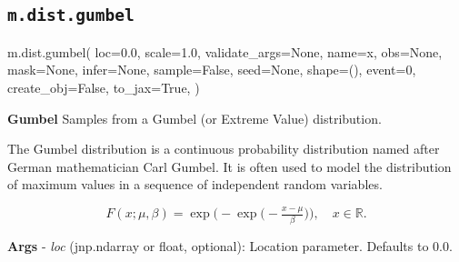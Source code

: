 \documentclass[
  letterpaper,
  DIV=11,
  numbers=noendperiod]{scrartcl}
\newenvironment{Shaded}{\begin{snugshade}}{\end{snugshade}}
\newcommand{\DecValTok}[1]{\textcolor[rgb]{0.68,0.00,0.00}{#1}}
\newcommand{\FloatTok}[1]{\textcolor[rgb]{0.68,0.00,0.00}{#1}}
\newcommand{\NormalTok}[1]{\textcolor[rgb]{0.00,0.23,0.31}{#1}}
\newcommand{\OperatorTok}[1]{\textcolor[rgb]{0.37,0.37,0.37}{#1}}
\newcommand{\StringTok}[1]{\textcolor[rgb]{0.13,0.47,0.30}{#1}}
\newcommand{\VariableTok}[1]{\textcolor[rgb]{0.07,0.07,0.07}{#1}}
\begin{document}
\subsection{\texorpdfstring{\texttt{m.dist.gumbel}}{m.dist.gumbel}}\label{gumbel}

\begin{Shaded}
\begin{Highlighting}[]
\NormalTok{m.dist.gumbel(}
\NormalTok{    loc}\OperatorTok{=}\FloatTok{0.0}\NormalTok{,}
\NormalTok{    scale}\OperatorTok{=}\FloatTok{1.0}\NormalTok{,}
\NormalTok{    validate\_args}\OperatorTok{=}\VariableTok{None}\NormalTok{,}
\NormalTok{    name}\OperatorTok{=}\StringTok{\textquotesingle{}x\textquotesingle{}}\NormalTok{,}
\NormalTok{    obs}\OperatorTok{=}\VariableTok{None}\NormalTok{,}
\NormalTok{    mask}\OperatorTok{=}\VariableTok{None}\NormalTok{,}
\NormalTok{    infer}\OperatorTok{=}\VariableTok{None}\NormalTok{,}
\NormalTok{    sample}\OperatorTok{=}\VariableTok{False}\NormalTok{,}
\NormalTok{    seed}\OperatorTok{=}\VariableTok{None}\NormalTok{,}
\NormalTok{    shape}\OperatorTok{=}\NormalTok{(),}
\NormalTok{    event}\OperatorTok{=}\DecValTok{0}\NormalTok{,}
\NormalTok{    create\_obj}\OperatorTok{=}\VariableTok{False}\NormalTok{,}
\NormalTok{    to\_jax}\OperatorTok{=}\VariableTok{True}\NormalTok{,}
\NormalTok{)}
\end{Highlighting}
\end{Shaded}

\textbf{Gumbel} Samples from a Gumbel (or Extreme Value) distribution.

The Gumbel distribution is a continuous probability distribution named
after German mathematician Carl Gumbel. It is often used to model the
distribution of maximum values in a sequence of independent random
variables.

\[
  F(x;\mu,\beta) = \exp\bigl( -\exp\bigl( -\tfrac{x - \mu}{\beta} \bigr) \bigr), \quad x \in \mathbb{R}.
  \]

\textbf{Args} - \emph{loc} (jnp.ndarray or float, optional): Location
parameter. Defaults to 0.0.
\end{document}
